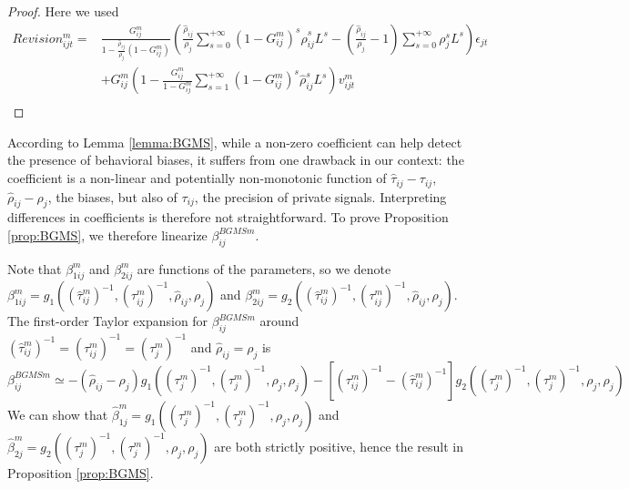 \begin{proof}
Here we used
$$\begin{array}{ll}Revision_{ijt}^m=&\frac{G_{ij}^m}{1-\frac{\hat\rho_{ij}}{\rho_j}(1-G_{ij}^m)}\left(\frac{\hat\rho_{ij}}{\rho_j}\sum_{s=0}^{+\infty}(1-G_{ij}^m)^s\hat\rho_{ij}^sL^s-\left(\frac{\hat\rho_{ij}}{\rho_j}-1\right)\sum_{s=0}^{+\infty}\rho_{j}^sL^s\right)\epsilon_{jt}\\
&+G_{ij}^m\left(1-\frac{G_{ij}^m}{1-G_{ij}^m}\sum_{s=1}^{+\infty}(1-G_{ij}^m)^s\hat\rho_{ij}^sL^s\right)v_{ijt}^m\\
\end{array}$$

\end{proof}

According to Lemma \ref{lemma:BGMS}, while a non-zero coefficient can help detect the presence of behavioral biases, it suffers from one drawback in our context: the coefficient is a non-linear and potentially non-monotonic function of $\hat\tau_{ij}-\tau_{ij}$, $\hat\rho_{ij}-\rho_{j}$, the biases, but also of $\tau_{ij}$, the precision of private signals. Interpreting differences in coefficients is therefore not straightforward. To prove Proposition \ref{prop:BGMS}, we therefore linearize $\beta_{ij}^{BGMSm}$.


Note that $\beta_{1ij}^m$ and $\beta_{2ij}^m$ are functions of the parameters, so we denote $\beta_{1ij}^m=g_1\left((\hat\tau_{ij}^m)^{-1},(\tau_{ij}^m)^{-1},\hat\rho_{ij},\rho_j\right)$ and $\beta_{2ij}^m=g_2\left((\hat\tau_{ij}^m)^{-1},(\tau_{ij}^m)^{-1},\hat\rho_{ij},\rho_j\right)$. The first-order Taylor expansion for $\beta_{ij}^{BGMSm}$ around $(\hat\tau_{ij}^m)^{-1}=(\tau_{ij}^m)^{-1}=(\tau_j^m)^{-1}$ and $\hat\rho_{ij}=\rho_j$ is
$$\beta_{ij}^{BGMSm}\simeq -(\hat\rho_{ij}-\rho_j)g_1\left((\tau_{j}^m)^{-1},(\tau_{j}^m)^{-1},\rho_{j},\rho_j\right) - [(\tau_{ij}^m)^{-1}-(\hat\tau_{ij}^m)^{-1}]g_2\left((\tau_{j}^m)^{-1},(\tau_{j}^m)^{-1},\rho_{j},\rho_j\right)$$
We can show that $\hat\beta_{1j}^m=g_1\left((\tau_{j}^m)^{-1},(\tau_{j}^m)^{-1},\rho_{j},\rho_j\right)$ and $\hat\beta_{2j}^m=g_2\left((\tau_{j}^m)^{-1},(\tau_{j}^m)^{-1},\rho_{j},\rho_j\right)$ are both strictly positive, hence the result in Proposition \ref{prop:BGMS}.

